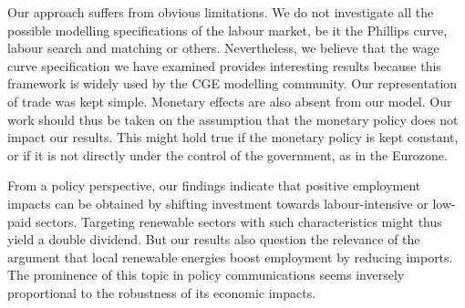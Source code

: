 Our approach suffers from obvious limitations. We do not investigate all the possible modelling specifications of the labour market, be it the Phillips curve, labour search and matching or others. Nevertheless, we believe that the wage curve specification we have examined provides interesting results because this framework is widely used by the CGE modelling community.
Our representation of trade was kept simple. Monetary effects are also absent from our model. Our work should thus be taken on the assumption that the monetary policy does not impact our results. This might hold true if the monetary policy is kept constant, or if it is not directly under the control of the government, as in the Eurozone.

From a policy perspective, our findings indicate that positive employment impacts can be obtained by shifting investment towards labour-intensive or low-paid sectors. Targeting renewable sectors with such characteristics might thus yield a double dividend.
But our results also question the relevance of the argument that local renewable energies boost employment by reducing imports. The prominence of this topic in policy communications seems inversely proportional to the robustness of its economic impacts. 